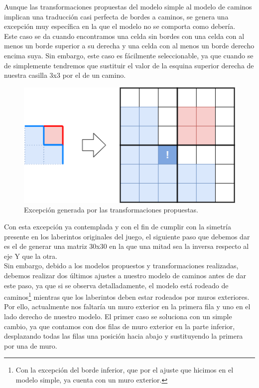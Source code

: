 Aunque las transformaciones propuestas del modelo simple al modelo de caminos implican una traducción casi perfecta de bordes a caminos, se genera una excepción muy específica en la que el modelo no se comporta como debería.\\

Este caso se da cuando encontramos una celda sin bordes con una celda con al menos un borde superior a su derecha y una celda con al menos un borde derecho encima suya. Sin embargo, este caso es fácilmente seleccionable, ya que cuando se de simplemente tendremos que sustituir el valor de la esquina superior derecha de nuestra casilla 3x3 por el de un camino.

\begin{figure}[H]
    \begin{center}
        \includegraphics[scale=0.5]{img/grafo3x3.png}
        \caption{Excepción generada por las transformaciones propuestas.}
    \end{center}
\end{figure}

Con esta excepción ya contemplada y con el fin de cumplir con la simetría presente en los laberintos originales del juego, el siguiente paso que debemos dar es el de generar una matriz 30x30 en la que una mitad sea la inversa respecto al eje Y que la otra.\\

Sin embargo, debido a los modelos propuestos y transformaciones realizadas, debemos realizar dos últimos ajustes a nuestro modelo de caminos antes de dar este paso, ya que si se observa detalladamente, el modelo está rodeado de caminos\footnote{Con la excepción del borde inferior, que por el ajuste que hicimos en el modelo simple, ya cuenta con un muro exterior.} mientras que los laberintos deben estar rodeados por muros exteriores.\\

Por ello, actualmente nos faltaría un muro exterior en la primera fila y uno en el lado derecho de nuestro modelo. El primer caso se soluciona con un simple cambio, ya que contamos con dos filas de muro exterior en la parte inferior, desplazando todas las filas una posición hacia abajo y sustituyendo la primera por una de muro.\\

